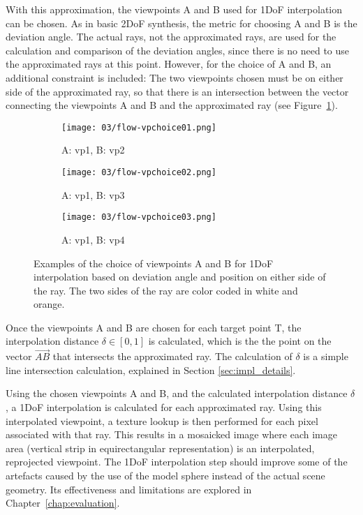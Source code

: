 With this approximation, the viewpoints A and B used for 1DoF interpolation can be chosen. As in basic 2DoF synthesis, the metric for choosing A and B is the deviation angle. The actual rays, not the approximated rays, are used for the calculation and comparison of the deviation angles, since there is no need to use the approximated rays at this point. However, for the choice of A and B, an additional constraint is included: The two viewpoints chosen must be on either side of the approximated ray, so that there is an intersection between the vector connecting the viewpoints A and B and the approximated ray (see Figure~\ref{fig:flow_vpchoice}).

\begin{figure}
\centering
    \hfill
    \begin{subfigure}[t]{0.3\textwidth}
            \centering
            \texttt{[image: 03/flow-vpchoice01.png]}
            \caption{A: vp1, B: vp2}
    \end{subfigure}%
    \hfill
    \begin{subfigure}[t]{0.3\textwidth}
            \centering
            \texttt{[image: 03/flow-vpchoice02.png]}
            \caption{A: vp1, B: vp3}
    \end{subfigure}
    \hfill
    \begin{subfigure}[t]{0.3\textwidth}
            \centering
            \texttt{[image: 03/flow-vpchoice03.png]}
            \caption{A: vp1, B: vp4}
    \end{subfigure}%
    \hfill
    \hfill
  \caption{Examples of the choice of viewpoints A and B for 1DoF interpolation based on deviation angle and position on either side of the ray. The two sides of the ray are color coded in white and orange.} \label{fig:flow_vpchoice}
\end{figure}

Once the viewpoints A and B are chosen for each target point T, the interpolation distance $\delta \in [0,1]$ is calculated, which is the the point on the vector $\overrightarrow{AB}$ that intersects the approximated ray. The calculation of $\delta$ is a simple line intersection calculation, explained in Section \ref{sec:impl_details}.

Using the chosen viewpoints A and B, and the calculated interpolation distance $\delta$, a 1DoF interpolation is calculated for each approximated ray. Using this interpolated viewpoint, a texture lookup is then performed for each pixel associated with that ray. This results in a mosaicked image where each image area (vertical strip in equirectangular representation) is an interpolated, reprojected viewpoint. The 1DoF interpolation step should improve some of the artefacts caused by the use of the model sphere instead of the actual scene geometry. Its effectiveness and limitations are explored in Chapter~\ref{chap:evaluation}.

